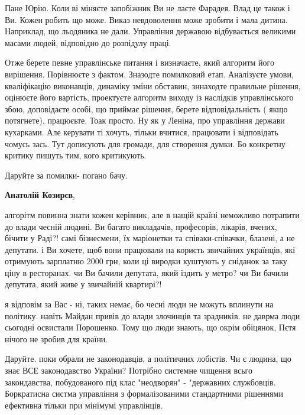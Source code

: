 \begin{itemize}

Пане Юрію. Коли ві міняєте запобіжник Ви не лаєте Фарадея. Влад це також і Ви.
Кожен робить що може. Виказ невдоволення може зробити і мала дитина. Наприклад,
що льодяника не дали. Управління державою відбувається великими масами людей,
відповідно до розпідулу праці. 

Отже берете певне управлінське питання і
визначаєте, який алгоритм його вирішення. Порівнюєте з фактом. Зназодте
помилковий етап. Аналізуєте умови, кваліфікацію виконавців, динаміку зміни
обставин, зннаходте правильне рішення, оцінюєте його вартість, проектуєте
алгоритм виходу із наслідків управлінського збою, доповідаєте особі, що приймає
рішення, берете відповідальність ( якщо потягнете), працюєьте. Тоак просто. Ну
як у Леніна, про управління держави кухарками. Але керувати ті хочуть, тільки
вчитися, працювати і відповідать чомусь зась. Тут дописують для громади, для
створення думки. Бо конкретну критику пишуть тим, кого критикують.


Даруйте за помилки- погано бачу.

\textbf{Анатолій Козирєв}, 

алгорітм повинна знати кожен керівник, але в нащій країні неможливо потрапити
до влади чесній людині. Ви багато викладачів, професорів, лікарів, вчених,
бічити у Раді?! самі бізнесмени, їх маріонетки та співаки-співачки, блазені, а
не депутати. і Ви хочете, щоб вони працювали на користь звичайних українців,
які отримують зарплатню 2000 грн, коли ці виродки куштують у сніданок за таку
ціну в ресторанах. чи Ви бачили депутата, який їздить у метро? чи Ви бачили
депутата, який живе у звичайній квартирі?!


я відповім за Вас - ні, таких немає, бо чесні люди не можуть вплинути на
політику. навіть Майдан привів до влади злочинців та зрадників. не даврма люди
сьогодні освистали Порошенко. Тому що люди знають, що окрім обіцянок, Пєтя
нічого не зробив для країни.


Даруйте. поки обрали не законодавців, а політичних лобістів. Чи є людина, що
знає ВСЕ законодавство України? Потрібно системне чищення всьго закондавства,
побудованого під клас "неодворян" - "державних службовців. Боркратисна систма
управління з формалізованими стандартними рішеннями ефективна тільки при
мінімумі управлінців. 


\end{itemize}
